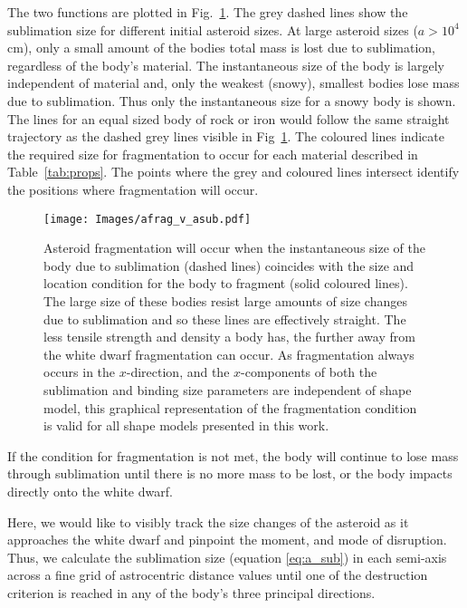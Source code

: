 \documentclass[fleqn,usenatbib]{mnras}
\begin{document}
The two functions are plotted in Fig.~\ref{fig:crossing_function}.
The grey dashed lines show the sublimation size for different initial asteroid sizes.
At large asteroid sizes ($a > 10^4$cm), only a small amount of the bodies total mass is lost due to sublimation, regardless of the body's material.
The instantaneous size of the body is largely independent of material and, only the weakest (snowy), smallest bodies lose mass due to sublimation.
Thus only the instantaneous size for a snowy body is shown. 
The lines for an equal sized body of rock or iron would follow the same straight trajectory as the dashed grey lines visible in Fig~\ref{fig:crossing_function}.
The coloured lines indicate the required size for fragmentation to occur for each material described in Table~\ref{tab:props}.
The points where the grey and coloured lines intersect identify the positions where fragmentation will occur.
\begin{figure}
	\texttt{[image: Images/afrag\_v\_asub.pdf]}
    \caption{Asteroid fragmentation will occur when the instantaneous size of the body due to sublimation (dashed lines) coincides with the size and location condition for the body to fragment (solid coloured lines).
    The large size of these bodies resist large amounts of size changes due to sublimation and so these lines are effectively straight.
    The less tensile strength and density a body has, the further away from the white dwarf fragmentation can occur.
    As fragmentation always occurs in the $x$-direction, and the $x$-components of both the sublimation and binding size parameters are independent of shape model, this graphical representation of the fragmentation condition is valid for all shape models presented in this work.}
    \label{fig:crossing_function}
\end{figure}
If the condition for fragmentation is not met, the body will continue to lose mass through sublimation until there is no more mass to be lost, or the body impacts directly onto the white dwarf.

Here, we would like to visibly track the size changes of the asteroid as it approaches the white dwarf and pinpoint the moment, and mode of disruption.
Thus, we calculate the sublimation size (equation \ref{eq:a_sub}) in each semi-axis across a fine grid of astrocentric distance values until one of the destruction criterion is reached in any of the body's three principal directions. 
\end{document}
